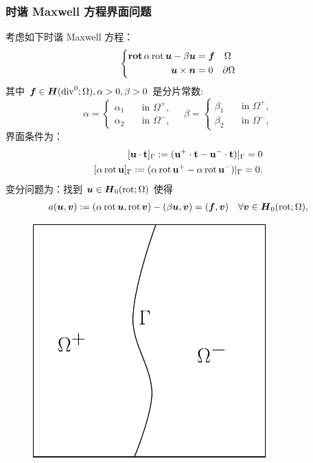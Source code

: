 \documentclass[notheorems,serif]{beamer}
\begin{document}
\begin{frame}
    \frametitle{时谐 Maxwell 方程界面问题}
\begin{minipage}[b]{0.6\linewidth}
\small
    考虑如下时谐 Maxwell 方程：
    $$
    \left\{
    \begin{aligned}
        \operatorname{\mathbf{rot}} \alpha \operatorname{rot} \boldsymbol{u} - \beta \boldsymbol{u} & = \boldsymbol{f} \quad
        \Omega\\
        \boldsymbol{u}\times \boldsymbol{n} & = 0 \quad \partial\Omega
    \end{aligned}
    \right.
    $$
    其中 $\boldsymbol{f} \in \boldsymbol{H}(\mathrm{div}^0; \Omega), \alpha > 0, \beta > 0$ 是分片常数:
    $$
    \alpha = \left\{
    \begin{aligned}
        \alpha_1 \quad & \text{in } \Omega^+,\\
        \alpha_2 \quad & \text{in } \Omega^-,
    \end{aligned}
\right.\quad
\beta = \left\{
\begin{aligned}
    \beta_1 \quad & \text{in } \Omega^+,\\
    \beta_2 \quad & \text{in } \Omega^-,
\end{aligned}
\right.
    $$
    界面条件为：
$$
\begin{aligned}
[\mathbf{u}\cdot\mathbf{t}]_{\Gamma} :=
(\mathbf{u}^+\cdot\mathbf{t}-\mathbf{u}^-\cdot\mathbf{t})|_{\Gamma} = 0\\
[\alpha \rot \mathbf{u}]_{\Gamma} := (\alpha \rot \mathbf{u}^+
- \alpha \rot \mathbf{u}^-)|_{\Gamma} = 0.
\end{aligned}
$$
变分问题为：找到 $\boldsymbol{u} \in \boldsymbol{H}_0(\operatorname{rot};\Omega)$ 使得
$$
\begin{aligned}
    a(\boldsymbol{u}, \boldsymbol{v}) := (\alpha \operatorname{rot} \boldsymbol{u}, \operatorname{rot} \boldsymbol{v}) - (\beta \boldsymbol{u}, \boldsymbol{v}) =
    (\boldsymbol{f}, \boldsymbol{v}) \quad \forall \boldsymbol{v} \in \boldsymbol{H}_0(\operatorname{rot};\Omega),
\end{aligned}
$$
\end{minipage}
\hfill
\begin{minipage}[b]{0.38\linewidth}
    \centering
    \begin{figure}[htpb]
        \centering
        \includegraphics[width=0.8\textwidth]{../figures/interface_prob.pdf}

\end{figure}
\end{minipage}
\end{frame}
\end{document}
